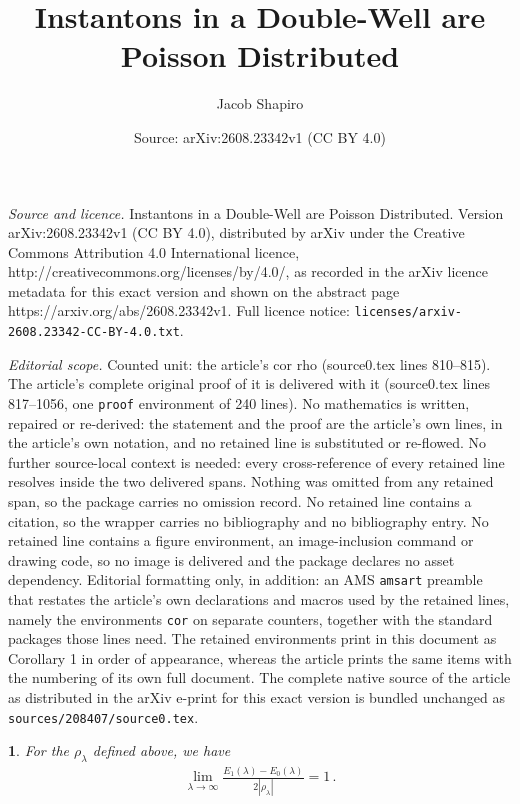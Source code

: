 \documentclass[10pt,a4paper]{amsart}
\title{Instantons in a Double-Well are Poisson Distributed}
\author{Jacob Shapiro}
\date{Source: arXiv:2608.23342v1 (CC BY 4.0)}
\newtheorem{cor}{}
\newcommand{\abs}[1]{\left\lvert#1\right\rvert}
\newcommand{\eql}[1]{\begin{align}#1\end{align}}
\begin{document}
\maketitle

\noindent\emph{Source and licence.} Instantons in a Double-Well are Poisson Distributed. Version arXiv:2608.23342v1 (CC BY 4.0), distributed by arXiv under the Creative Commons Attribution 4.0 International licence, http://creativecommons.org/licenses/by/4.0/, as recorded in the arXiv licence metadata for this exact version and shown on the abstract page https://arxiv.org/abs/2608.23342v1. Full licence notice: \texttt{licenses/arxiv-2608.23342-CC-BY-4.0.txt}.\par\smallskip

\noindent\textit{Editorial scope.} Counted unit: the article's cor rho (source0.tex lines 810--815). The article's complete original proof of it is delivered with it (source0.tex lines 817--1056, one \texttt{proof} environment of 240 lines). No mathematics is written, repaired or re-derived: the statement and the proof are the article's own lines, in the article's own notation, and no retained line is substituted or re-flowed.  No further source-local context is needed: every cross-reference of every retained line resolves inside the two delivered spans.  Nothing was omitted from any retained span, so the package carries no omission record.  No retained line contains a citation, so the wrapper carries no bibliography and no bibliography entry.  No retained line contains a figure environment, an image-inclusion command or drawing code, so no image is delivered and the package declares no asset dependency.  Editorial formatting only, in addition: an AMS \texttt{amsart} preamble that restates the article's own declarations and macros used by the retained lines, namely the environments \texttt{cor} on separate counters, together with the standard packages those lines need.  The retained environments print in this document as Corollary 1 in order of appearance, whereas the article prints the same items with the numbering of its own full document.  The complete native source of the article as distributed in the arXiv e-print for this exact version is bundled unchanged as \texttt{sources/208407/source0.tex}.
\begin{cor}\label{cor:eigenvalue splitting controlled by rho}
    For the $\rho_\lambda$ defined above, we have
    \eql{
    \lim_{\lambda\to\infty}\frac{E_1(\lambda)-E_0(\lambda)}{2\abs{\rho_\lambda}} = 1\,.
    }
\end{cor}
\end{document}
